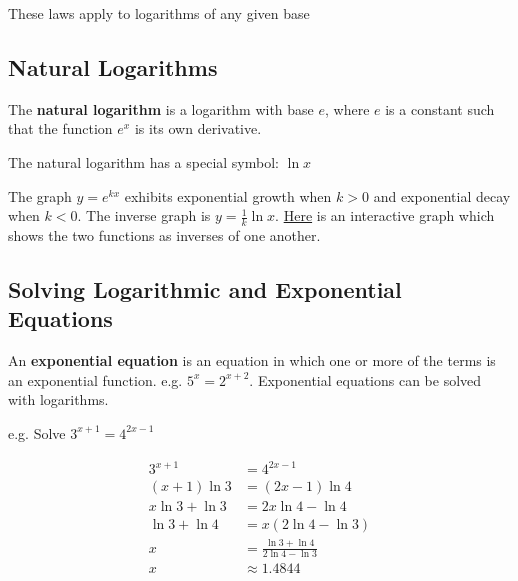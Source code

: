 These laws apply to logarithms of any given base




\subsection{Natural Logarithms}
\label{sss:natu-fc34}




The \textbf{natural logarithm} is a logarithm with base $e$, where $e$ is a constant such
that the function $e^x$ is its own derivative.



The natural logarithm has a special symbol: $\ln x$



The graph $y = e^{kx}$ exhibits exponential growth when $k > 0$ and exponential decay when
$k < 0$. The inverse graph is $y = \frac{1}{k} \ln x$.
\href{https://www.desmos.com/calculator/azbv4kz38z}{Here} is an interactive graph which
shows the two functions as inverses of one another.




\subsection{Solving Logarithmic and Exponential Equations}
\label{sss:solv-0876}




An \textbf{exponential equation} is an equation in which one or more of the terms is an
exponential function. e.g. $5^x = 2^{x+2}$. Exponential equations can be solved with
logarithms.



e.g. Solve $3^{x+1} = 4^{2x-1}$



\begin{align} 3^{x+1} & = 4^{2x-1} \\ (x+1)\ln 3 & = (2x-1)\ln 4 \\ x\ln 3 + \ln 3 & = 2x\ln 4 - \ln 4 \\ \ln 3 + \ln 4 & = x(2\ln 4 - \ln 3) \\ x & = \frac{\ln 3 + \ln 4}{2\ln 4 - \ln 3} \\ x & \approx 1.4844 \end{align}




